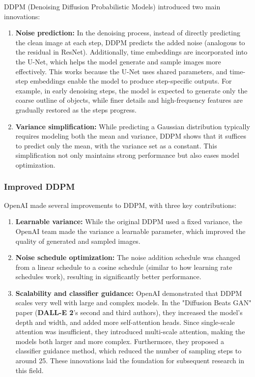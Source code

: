 \documentclass{article}
\begin{document}
DDPM (Denoising Diffusion Probabilistic Models) introduced two main innovations:

\begin{enumerate}
    \item \textbf{Noise prediction:} In the denoising process, instead of directly predicting the clean image 
    at each step, DDPM predicts the added noise (analogous to the residual in ResNet). Additionally, time 
    embeddings are incorporated into the U-Net, which helps the model generate and sample images more 
    effectively. This works because the U-Net uses shared parameters, and time-step embeddings enable the 
    model to produce step-specific outputs. For example, in early denoising steps, the model is expected to 
    generate only the coarse outline of objects, while finer details and high-frequency features are 
    gradually restored as the steps progress.
    \item \textbf{Variance simplification:} While predicting a Gaussian distribution typically requires 
    modeling both the mean and variance, DDPM shows that it suffices to predict only the mean, with the 
    variance set as a constant. This simplification not only maintains strong performance but also eases 
    model optimization.
\end{enumerate}

\subsubsection{Improved DDPM}

OpenAI made several improvements to DDPM, with three key contributions:

\begin{enumerate}
    \item \textbf{Learnable variance:} While the original DDPM used a fixed variance, the OpenAI team made 
    the variance a learnable parameter, which improved the quality of generated and sampled images.
    \item \textbf{Noise schedule optimization:} The noise addition schedule was changed from a linear 
    schedule to a cosine schedule (similar to how learning rate schedules work), resulting in significantly 
    better performance.
    \item \textbf{Scalability and classifier guidance:} OpenAI demonstrated that DDPM scales very well with 
    large and complex models. In the "Diffusion Beats GAN" paper (\textbf{DALL-E 2}'s second and third 
    authors), they increased the model's depth and width, and added more self-attention heads. Since 
    single-scale attention was insufficient, they introduced multi-scale attention, making the models both 
    larger and more complex. Furthermore, they proposed a classifier guidance method, which reduced the 
    number of sampling steps to around 25. These innovations laid the foundation for subsequent research in 
    this field.
\end{enumerate}
\end{document}
